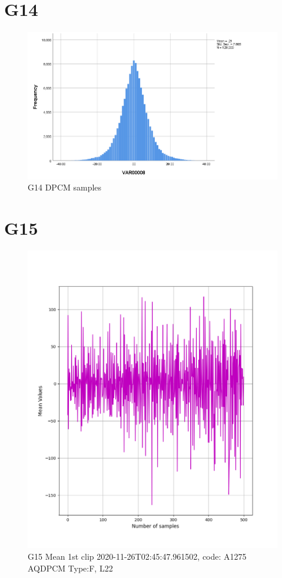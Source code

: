 \documentclass[hidelinks, 12pt, a4paper]{article}
\begin{document}
\section{G14}
\begin{figure}[h!]
	\centering
		\includegraphics[height=.38\textheight, width=\textwidth]{assets/session1/g14.png}
		\caption{G14 DPCM  samples}
	\end{figure}

\section{G15}

\begin{figure}[h!]
\centering
	\includegraphics[height=.38\textheight, width=\textwidth]{assets/session1/g15.png}
    \caption{G15 Mean 1st clip 2020-11-26T02:45:47.961502, code: A1275 AQDPCM Type:F, L22}
\end{figure}
\end{document}
